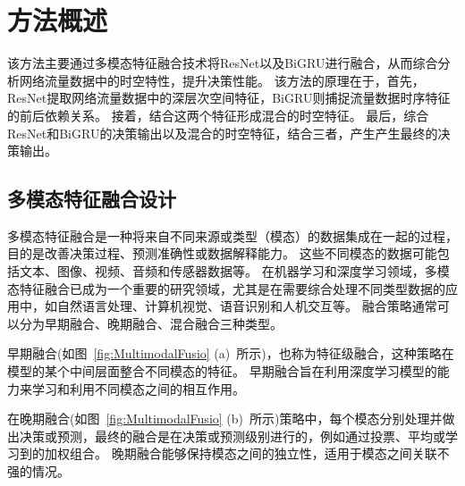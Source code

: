 
\section{方法概述}
该方法主要通过多模态特征融合技术将ResNet以及BiGRU进行融合，从而综合分析网络流量数据中的时空特性，提升决策性能。
该方法的原理在于，首先，ResNet提取网络流量数据中的深层次空间特征，BiGRU则捕捉流量数据时序特征的前后依赖关系。
接着，结合这两个特征形成混合的时空特征。
最后，综合ResNet和BiGRU的决策输出以及混合的时空特征，结合三者，产生产生最终的决策输出。
\subsection{多模态特征融合设计}
多模态特征融合是一种将来自不同来源或类型（模态）的数据集成在一起的过程，目的是改善决策过程、预测准确性或数据解释能力。
这些不同模态的数据可能包括文本、图像、视频、音频和传感器数据等。
在机器学习和深度学习领域，多模态特征融合已成为一个重要的研究领域，尤其是在需要综合处理不同类型数据的应用中，如自然语言处理、计算机视觉、语音识别和人机交互等。
融合策略通常可以分为早期融合、晚期融合、混合融合三种类型。\par

早期融合(如图~\ref{fig:MultimodalFusio} (a)~所示)，也称为特征级融合，这种策略在模型的某个中间层面整合不同模态的特征。
早期融合旨在利用深度学习模型的能力来学习和利用不同模态之间的相互作用。\par

在晚期融合(如图~\ref{fig:MultimodalFusio} (b)~所示)策略中，每个模态分别处理并做出决策或预测，最终的融合是在决策或预测级别进行的，例如通过投票、平均或学习到的加权组合。
晚期融合能够保持模态之间的独立性，适用于模态之间关联不强的情况。\par

